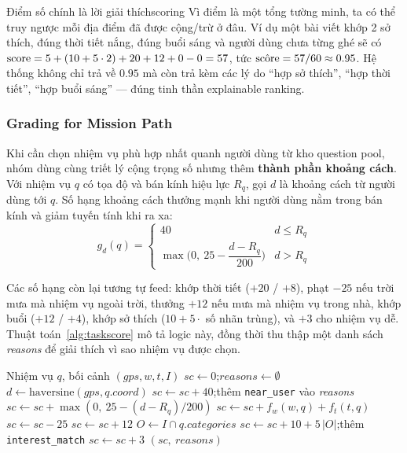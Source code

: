 \begin{myinsight}{Điểm số chính là lời giải thích}{scoring}
Vì điểm là một tổng tường minh, ta có thể truy ngược mỗi địa điểm đã được
cộng/trừ ở đâu. Ví dụ một bài viết khớp 2 sở thích, đúng thời tiết nắng,
đúng buổi sáng và người dùng chưa từng ghé sẽ có
$\operatorname{score} = 5 + (10 + 5\cdot 2) + 20 + 12 + 0 - 0 = 57$, tức
$\hat{\operatorname{score}} = 57/60 \approx 0.95$. Hệ thống không chỉ trả về $0.95$ mà
còn trả kèm các lý do ``hợp sở thích'', ``hợp thời tiết'', ``hợp buổi
sáng'' --- đúng tinh thần explainable ranking.
\end{myinsight}

\subsubsection{Grading for Mission Path}
\contrib

Khi cần chọn nhiệm vụ phù hợp nhất quanh người dùng từ kho question pool,
nhóm dùng cùng triết lý cộng trọng số nhưng thêm \textbf{thành phần
khoảng cách}. Với nhiệm vụ $q$ có tọa độ và bán kính hiệu lực $R_q$, gọi
$d$ là khoảng cách từ người dùng tới $q$. Số hạng khoảng cách thưởng mạnh
khi người dùng nằm trong bán kính và giảm tuyến tính khi ra xa:
\begin{equation}
g_d(q) =
\begin{cases}
40 & d \le R_q \\[2pt]
\max\!\big(0,\ 25 - \dfrac{d - R_q}{200}\big) & d > R_q
\end{cases}
\label{eq:task_dist}
\end{equation}

Các số hạng còn lại tương tự feed: khớp thời tiết ($+20$ / $+8$), phạt
$-25$ nếu trời mưa mà nhiệm vụ ngoài trời, thưởng $+12$ nếu mưa mà nhiệm
vụ trong nhà, khớp buổi ($+12$ / $+4$), khớp sở thích ($10 + 5\cdot$ số
nhãn trùng), và $+3$ cho nhiệm vụ dễ. Thuật toán~\ref{alg:taskscore} mô
tả logic này, đồng thời thu thập một danh sách \textit{reasons} để giải
thích vì sao nhiệm vụ được chọn.

\begin{algorithm}[H]
\caption{Chấm điểm chọn nhiệm vụ theo ngữ cảnh}
\label{alg:taskscore}
\begin{algorithmic}[1]
\Require Nhiệm vụ $q$, bối cảnh $(\textit{gps}, w, t, I)$
\State $sc \gets 0$;\quad $\textit{reasons} \gets \emptyset$
\State $d \gets \mathrm{haversine}(\textit{gps}, q.\textit{coord})$
    \State $sc \gets sc + 40$;\quad thêm \texttt{near\_user} vào \textit{reasons}
\Else
    \State $sc \gets sc + \max(0,\ 25 - (d - R_q)/200)$
\EndIf
\State $sc \gets sc + f_w(w,q) + f_t(t,q)$ 
 \State $sc \gets sc - 25$ \EndIf
{} \State $sc \gets sc + 12$ \EndIf
\State $O \gets I \cap q.\textit{categories}$
 \State $sc \gets sc + 10 + 5\,|O|$;\quad thêm \texttt{interest\_match} \EndIf
{} \State $sc \gets sc + 3$ \EndIf
\State \Return $(sc,\ \textit{reasons})$
\end{algorithmic}
\end{algorithm}

